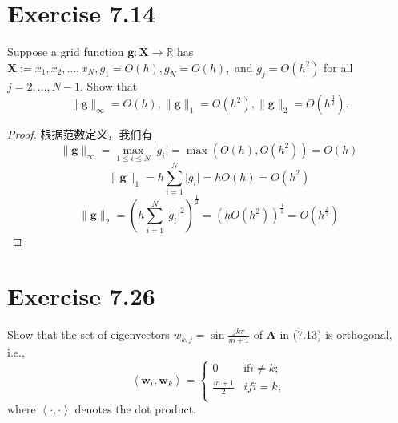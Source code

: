 \documentclass[twoside,a4paper]{ctexart}
\newcommand{\avg}[1]{\left\langle #1 \right\rangle}
\begin{document}
\pagestyle{fancy}
\fancyhead{}


\section*{Exercise 7.14}
Suppose a grid function $\textbf{g} : \textbf{X} \to \mathbb{R}$ has $\textbf{X} := {{x_1,x_2,\dots,x_N}}, g_1 = O(h), g_N=O(h),$ and $g_j=O(h^2)$ for all $j=2,\dots,N-1$. Show that
\begin{equation*}
\lVert\textbf{g}\rVert_\infty = O(h), \lVert\textbf{g}\rVert_1 = O(h^2), \lVert\textbf{g}\rVert_2= O(h^\frac{3}{2}).  
\end{equation*}

\begin{proof}
  根据范数定义，我们有
  \begin{equation*}
    \lVert\textbf{g}\rVert_\infty = \max_{1 \leq i \leq N}\lvert g_i\rvert = \max(O(h),O(h^2)) = O(h)
  \end{equation*}
    \begin{equation*}
    \lVert\textbf{g}\rVert_1 = h\sum_{i=1}^{N}\lvert g_i\rvert = hO(h) = O(h^2)
  \end{equation*}
  \begin{equation*}
    \lVert\textbf{g}\rVert_2 = (h\sum_{i=1}^{N}\lvert g_i\rvert^2)^{\frac{1}{2}} = (hO(h^2))^{\frac{1}{2}} = O(h^{\frac{3}{2}})
  \end{equation*}
\end{proof}


\section*{Exercise 7.26}
Show that the set of eigenvectors $w_{k,j} = \sin \frac{jk\pi}{m+1}$ of \textbf{A} in (7.13) is orthogonal, i.e.,
\[\avg{\textbf{w}_i,\textbf{w}_k} =
  \begin{cases}
    0 & \text{if} i \neq k;\\
    \frac{m+1}{2} & if i = k,\\
  \end{cases} \]
where $\avg{\cdot,\cdot}$ denotes the dot product.
\end{document}
